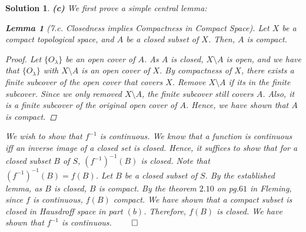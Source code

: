 \documentclass{article} %
\theoremstyle{quest}
\newtheorem*{lemma}{Lemma}
\newtheorem*{solution}{Solution}
\begin{document}
\begin{solution}
\bigskip

\textbf{(c)} We first prove a simple central lemma:
\begin{lemma}[7.c. Closedness implies Compactness in Compact Space]
\textit{Let $X$ be a compact topological space, and $A$ be a closed subset of $X$.
Then, $A$ is compact}.
\end{lemma}
\begin{proof}
Let $\{O_{\lambda}\}$ be an open cover of $A$. As $A$ is closed, $X\setminus A$ is open,
and we have that $\{O_{\lambda}\}$ with $X \setminus A$ is an open cover of $X$. By
compactness of $X$, there exists a finite subcover of the open cover that covers $X$. 
Remove $X \setminus A$ if its in the finite subcover. Since we only removed $X \setminus
A$, the finite subcover still covers $A$. Also, it is a finite 
subcover of the original open cover of $A$. Hence, we have shown that $A$ is compact. 
\end{proof}

We wish to show that $f^{-1}$ is continuous. We know that 
a function is continuous iff an inverse image of a closed set is closed.
Hence, it suffices to show that for a closed subset $B$ of $S$,
 $(f^{-1})^{-1}(B)$ is closed. Note that $(f^{-1})^{-1}(B) = f(B)$.
Let $B$ be a closed subset of $S$. By the established lemma, 
as $B$ is closed, $B$ is compact. By the theorem $2.10$ on pg.$61$ in Fleming,
since $f$ is continuous, $f(B)$ compact. We have shown that a compact subset is
closed in Hausdroff space in part $(b)$. Therefore, $f(B)$ is closed.
We have shown that $f^{-1}$ is continuous. 
\hfill $\qed$


\end{solution}
\newpage
\end{document}
